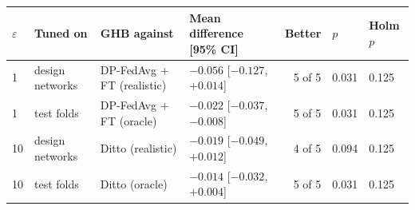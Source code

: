 \begin{tabular}{llllrll}
\toprule
$\varepsilon$ & Tuned on & GHB against & Mean difference [95\% CI] & Better & $p$ & Holm $p$ \\
\midrule
1 & design networks & DP-FedAvg + FT \cite{mcmahan2018learning} (realistic) & $-0.056$ [$-0.127$, $+0.014$] & 5 of 5 & 0.031 & 0.125 \\
1 & test folds & DP-FedAvg + FT \cite{mcmahan2018learning} (oracle) & $-0.022$ [$-0.037$, $-0.008$] & 5 of 5 & 0.031 & 0.125 \\
10 & design networks & Ditto \cite{li2021ditto} (realistic) & $-0.019$ [$-0.049$, $+0.012$] & 4 of 5 & 0.094 & 0.125 \\
10 & test folds & Ditto \cite{li2021ditto} (oracle) & $-0.014$ [$-0.032$, $+0.004$] & 5 of 5 & 0.031 & 0.125 \\
\bottomrule
\end{tabular}
